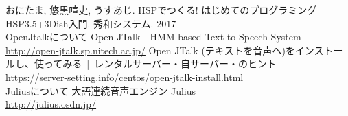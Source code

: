 \documentclass[a4paper,12pt]{ltjsbook}
\begin{document}
  
  
  
  
  
  
  
  
  
  
  
  
  
  
  
  
  \begin{thebibliography}{99}
   おにたま, 悠黒喧史, うすあじ. HSPでつくる! はじめてのプログラミング HSP3.5+3Dish入門. 秀和システム. 2017
  \\ OpenJtalkについて
   Open JTalk - HMM-based Text-to-Speech System \\ \url{http://open-jtalk.sp.nitech.ac.jp/}
   Open JTalk (テキストを音声へ)をインストールし、使ってみる | レンタルサーバー・自サーバー・のヒント \\ \url{https://server-setting.info/centos/open-jtalk-install.html}
  \\ Juliusについて
 大語連続音声エンジン Julius \\ \url{http://julius.osdn.jp/}
  \end{thebibliography}
\end{document}
